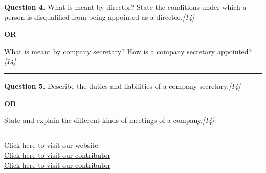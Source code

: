 \documentclass[11pt,a4paper]{article}
\newcommand{\pts}[1]{\hfill   \textit{[#1]}}
\begin{document}
\noindent   \textbf{Question 4.}
What is meant by director? State the conditions under which a person is disqualified from being appointed as a director.\pts{14}

\centerline{   \textbf{OR}}

What is meant by company secretary? How is a company secretary appointed?\pts{14}

\medskip\rule{\linewidth}{0.2pt}




\noindent   \textbf{Question 5.}
Describe the duties and liabilities of a company secretary.\pts{14}

\centerline{   \textbf{OR}}

State and explain the different kinds of meetings of a company.\pts{14}

\vfill
\rule{\linewidth}{0.4pt}

\begin{center}\small
\href{https://bhu-exam.vercel.app/}{Click here to visit our website}\\[4pt]
\href{https://me-aryan.vercel.app/}{Click here to visit our contributor}\\[4pt]
\href{https://quashan-me.vercel.app/}{Click here to visit our contributor}
\end{center}
\end{document}
